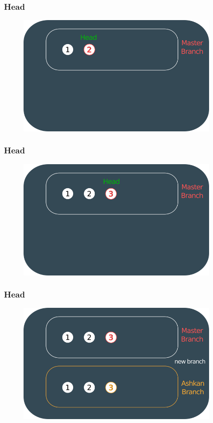 \documentclass{beamer}
\begin{document}
	\begin{frame}
		\frametitle{Head}
		\begin{figure}[htbp]
			\centering
			\includegraphics[width=10cm]{head3}
		\end{figure}
	\end{frame}
	
	\begin{frame}
		\frametitle{Head}
		\begin{figure}[htbp]
			\centering
			\includegraphics[width=10cm]{head4}
		\end{figure}
	\end{frame}
	
	\begin{frame}
		\frametitle{Head}
		\begin{figure}[htbp]
			\centering
			\includegraphics[width=10cm]{head5}
		\end{figure}
	\end{frame}
	
\end{document}
